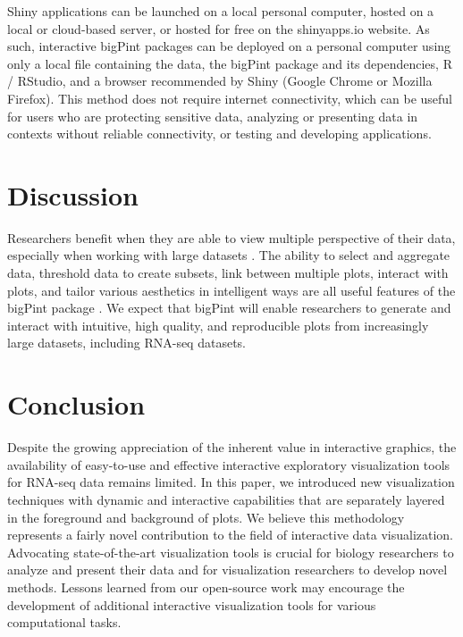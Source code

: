 \documentclass{bmcart}
\begin{document}
Shiny applications can be launched on a local personal computer, hosted on a local or cloud-based server, or hosted for free on the shinyapps.io website. As such, interactive bigPint packages can be deployed on a personal computer using only a local file containing the data, the bigPint package and its dependencies, R / RStudio, and a browser recommended by Shiny (Google Chrome or Mozilla Firefox). This method does not require internet connectivity, which can be useful for users who are protecting sensitive data, analyzing or presenting data in contexts without reliable connectivity, or testing and developing applications.

\section*{Discussion}

Researchers benefit when they are able to view multiple perspective of their data, especially when working with large datasets \cite{swayne2003ggobi, cook2007interactive}. The ability to select and aggregate data, threshold data to create subsets, link between multiple plots, interact with plots, and tailor various aesthetics in intelligent ways are all useful features of the bigPint package \cite{o2010visualizing, pavlopoulos2015visualizing, kerren2007human}. We expect that bigPint will enable researchers to generate and interact with intuitive, high quality, and reproducible plots from increasingly large datasets, including RNA-seq datasets. 

\section*{Conclusion}

Despite the growing appreciation of the inherent value in interactive graphics, the availability of easy-to-use and effective interactive exploratory visualization tools for RNA-seq data remains limited. In this paper, we introduced new visualization techniques with dynamic and interactive capabilities that are separately layered in the foreground and background of plots. We believe this methodology represents a fairly novel contribution to the field of interactive data visualization. Advocating state-of-the-art visualization tools is crucial for biology researchers to analyze and present their data and for visualization researchers to develop novel methods. Lessons learned from our open-source work may encourage the development of additional interactive visualization tools for various computational tasks.
\end{document}
